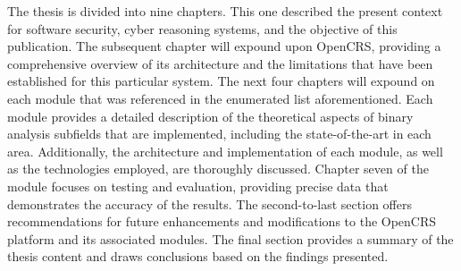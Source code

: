 \documentclass[../main.tex]{subfiles}
\begin{document}
The thesis is divided into nine chapters. This one described the present
context for software security, cyber reasoning systems, and the
objective of this publication. The subsequent chapter will expound upon
OpenCRS, providing a comprehensive overview of its architecture and the
limitations that have been established for this particular system. The
next four chapters will expound on each module that was referenced in
the enumerated list aforementioned. Each module provides a detailed
description of the theoretical aspects of binary analysis subfields that
are implemented, including the state-of-the-art in each area.
Additionally, the architecture and implementation of each module, as
well as the technologies employed, are thoroughly discussed. Chapter
seven of the module focuses on testing and evaluation, providing precise
data that demonstrates the accuracy of the results. The second-to-last
section offers recommendations for future enhancements and modifications
to the OpenCRS platform and its associated modules. The final section
provides a summary of the thesis content and draws conclusions based on
the findings presented.
\end{document}
